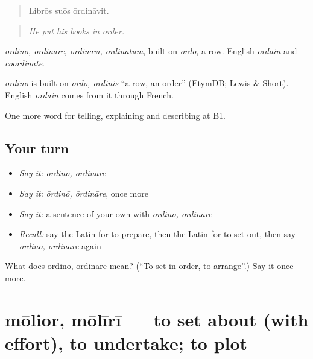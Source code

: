 \begin{quote}
Librōs suōs ōrdināvit.
\end{quote}

\begin{quote}
\emph{He put his books in order.}
\end{quote}

\emph{ōrdinō, ōrdināre, ōrdināvī, ōrdinātum}, built on \emph{ōrdō}, a row. English \emph{ordain} and \emph{coordinate}.

\begin{cousinweb}
\emph{ōrdinō} is built on \emph{ōrdō, ōrdinis} \textquotedblleft{}a row, an order\textquotedblright{} (EtymDB; Lewis \& Short). English \emph{ordain} comes from it through French.
\end{cousinweb}

\begin{grammarlens}[title={What you've built}]
One more word for telling, explaining and describing at B1.
\end{grammarlens}

\subsection*{Your turn}
\begin{itemize}
\raggedright
  \item \emph{Say it:} \emph{ōrdinō, ōrdināre}
  \item \emph{Say it:} \emph{ōrdinō, ōrdināre}, once more
  \item \emph{Say it:} a sentence of your own with \emph{ōrdinō, ōrdināre}
  \item \emph{Recall:} say the Latin for to prepare, then the Latin for to set out, then say \emph{ōrdinō, ōrdināre} again
\end{itemize}

\begin{tcolorbox}[breakable,colback=teal!4,colframe=teal!35!black,title={Before you move on}]
What does ōrdinō, ōrdināre mean? (\textquotedblleft{}To set in order, to arrange\textquotedblright{}.) Say it once more.
\end{tcolorbox}
\section[mōlior, mōlīrī]{mōlior, mōlīrī — to set about (with effort), to undertake; to plot}

\label{lesson:LA-C394-molior}




